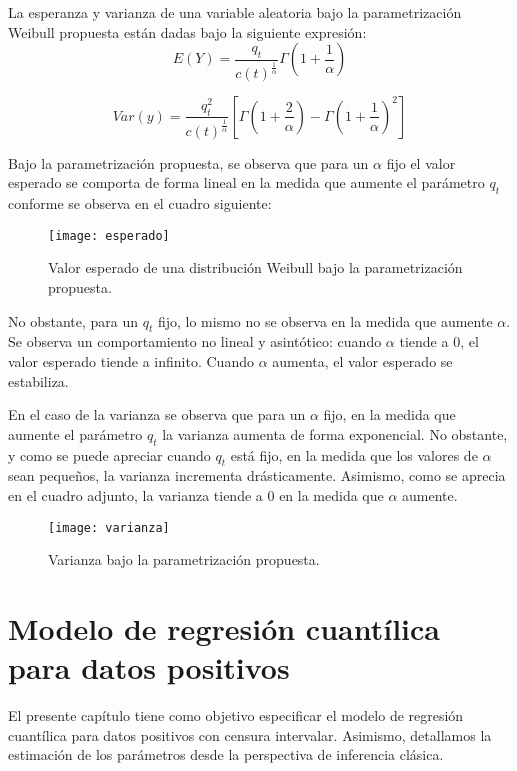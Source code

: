 \documentclass{report}
\begin{document}
La esperanza y varianza de una variable aleatoria bajo la parametrización Weibull propuesta están dadas bajo la siguiente expresión:
\begin{equation}
E(Y)=\frac{q_{t}}{c(t)^{\frac{1}{\alpha}}}\Gamma\left( 1+\frac{1}{\alpha} \right)
\end{equation}

\begin{equation}
Var(y)=\frac{q_{t}^{2}}{c(t)^{\frac{1}{\alpha}}}\left[ \Gamma\left( 1+\frac{2}{\alpha}\right)-\Gamma\left( 1+\frac{1}{\alpha} \right)^{2} \right]
\end{equation}

Bajo la parametrización propuesta, se observa que para un $\alpha$ fijo el valor esperado se comporta de forma lineal en la medida que aumente el parámetro $q_{t}$ conforme se observa en el cuadro siguiente:

\begin{figure}[H]
	\texttt{[image: esperado]}
	\caption{Valor esperado de una distribución Weibull bajo la parametrización propuesta.}
\end{figure}
\noindent No obstante, para un $q_{t}$ fijo, lo mismo no se observa en la medida que aumente $\alpha$. Se observa un comportamiento no lineal y asintótico: cuando $\alpha$ tiende a 0, el valor esperado tiende a infinito. Cuando $\alpha$ aumenta, el valor esperado se estabiliza.

En el caso de la varianza se observa que para un $\alpha$ fijo, en la medida que aumente el parámetro $q_{t}$ la varianza aumenta de forma exponencial. No obstante, y como se puede apreciar cuando $q_{t}$ está fijo, en la medida que los valores de $\alpha$ sean pequeños, la varianza incrementa drásticamente. Asimismo, como se aprecia en el cuadro adjunto, la varianza tiende a 0 en la medida que $\alpha$ aumente.

\begin{figure}[H]
	\texttt{[image: varianza]}
	\caption{Varianza bajo la parametrización propuesta.}
\end{figure}

\chapter{Modelo de regresión cuantílica para datos positivos}
El presente capítulo tiene como objetivo especificar el modelo de regresión cuantílica para datos positivos con censura intervalar. Asimismo, detallamos la estimación de los parámetros desde la perspectiva de inferencia clásica.
\end{document}
